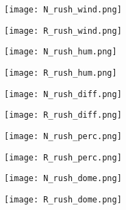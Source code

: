 \documentclass[12pt]{article}
\begin{document}
\begin{figure}[h!]
	\centering
	\begin{subfigure}[b]{0.4\linewidth}
		\texttt{[image: N\_rush\_wind.png]}
	\end{subfigure}
	\begin{subfigure}[b]{0.4\linewidth}
		\texttt{[image: R\_rush\_wind.png]}
	\end{subfigure}
\end{figure}

\begin{figure}[h!]
	\centering
	\begin{subfigure}[b]{0.4\linewidth}
		\texttt{[image: N\_rush\_hum.png]}
	\end{subfigure}
	\begin{subfigure}[b]{0.4\linewidth}
		\texttt{[image: R\_rush\_hum.png]}
	\end{subfigure}
\end{figure}

\begin{figure}[h!]
	\centering
	\begin{subfigure}[b]{0.4\linewidth}
		\texttt{[image: N\_rush\_diff.png]}
	\end{subfigure}
	\begin{subfigure}[b]{0.4\linewidth}
		\texttt{[image: R\_rush\_diff.png]}
	\end{subfigure}
\end{figure}

\begin{figure}[h!]
	\centering
	\begin{subfigure}[b]{0.4\linewidth}
		\texttt{[image: N\_rush\_perc.png]}
	\end{subfigure}
	\begin{subfigure}[b]{0.4\linewidth}
		\texttt{[image: R\_rush\_perc.png]}
	\end{subfigure}
\end{figure}

\begin{figure}[h!]
	\centering
	\begin{subfigure}[b]{0.4\linewidth}
		\texttt{[image: N\_rush\_dome.png]}
	\end{subfigure}
	\begin{subfigure}[b]{0.4\linewidth}
		\texttt{[image: R\_rush\_dome.png]}
	\end{subfigure}
\end{figure}
\end{document}
